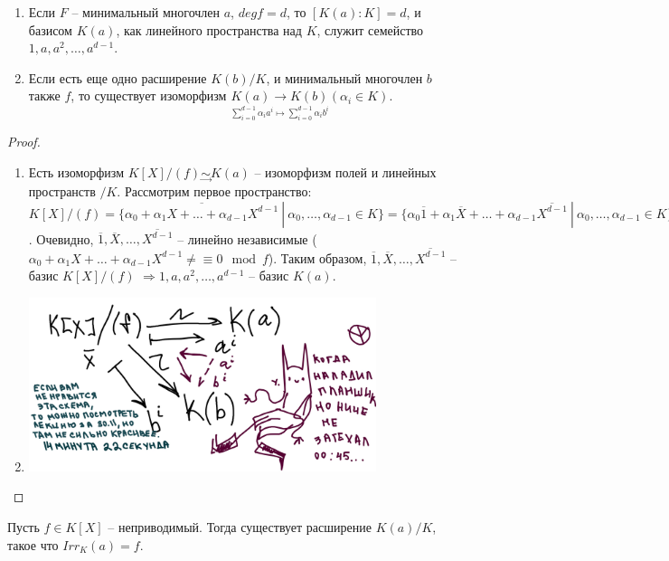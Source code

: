 \documentclass[main]{subfiles}
\begin{document}

\begin{corollary}
    \begin{enumerate}
        \item Если $F$ -- минимальный многочлен $a$, $deg f = d$, то $[K(a):K] = d$, и базисом $K(a)$, как линейного пространства над $K$, служит
    семейство $1, a, a^2, \ldots, a^{d-1}$.
        \item Если есть еще одно расширение $K(b)/K$, и минимальный многочлен $b$ также $f$, то существует изоморфизм
        $\underset{\sum_{i=0}^{d-1}\alpha_ia^i \mapsto \sum_{i=0}^{d-1}\alpha_ib^i}{K(a) \rightarrow K(b)} (\alpha_i \in K)$.
    \end{enumerate}
\end{corollary}

\begin{proof}
    \begin{enumerate}
    \item Есть изоморфизм $K[X]/(f) \underset{\rightarrow}{\sim } K(a)$ -- изоморфизм полей и линейных пространств $/K$. Рассмотрим первое пространство: 
    $K[X]/(f) = \{\overline{\alpha_0 + \alpha_1X + \ldots + \alpha_{d-1}X^{d-1}} \ | \ \alpha_0, \ldots, \alpha_{d-1} \in K\} = 
    \{\alpha_0\overline{1} + \alpha_1\overline{X} + \ldots + \alpha_{d-1}\overline{X^{d-1}} \ | \ \alpha_0, \ldots, \alpha_{d-1} \in K\}$.
    Очевидно, $\overline{1}, \overline{X}, \ldots, \overline{X^{d-1}}$ -- линейно независимые
    ($\alpha_0 + \alpha_1X + \ldots + \alpha_{d-1}X^{d-1} \ne\equiv 0 \mod f$). Таким образом, 
    $\overline{1}, \overline{X}, \ldots, \overline{X^{d-1}}$ -- базис $K[X]/(f)$ 
    $\Rightarrow 1, a, a^2, \ldots, a^{d-1}$ -- базис $K(a)$.
    \item \includegraphics[width=0.8\textwidth]{ugly_scheme.jpg}
    \end{enumerate}
\end{proof}

\begin{proposition}
    Пусть $f \in K[X]$ -- неприводимый. Тогда существует расширение $K(a)/K$, такое что $Irr_K(a) = f$.
\end{proposition}
\end{document}
